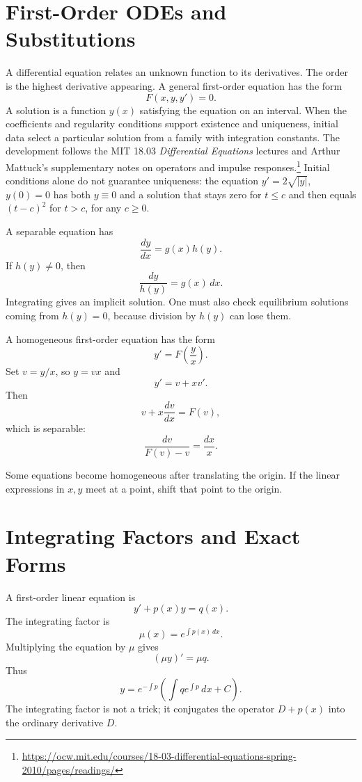 
\section{First-Order ODEs and Substitutions}

A differential equation relates an unknown function to its derivatives.  The order is the highest derivative appearing.  A general first-order equation has the form
\[
  F(x,y,y')=0.
\]
A solution is a function $y(x)$ satisfying the equation on an interval. When the coefficients and regularity conditions support existence and uniqueness, initial data select a particular solution from a family with integration constants. The development follows the MIT 18.03 \emph{Differential Equations} lectures and Arthur Mattuck's supplementary notes on operators and impulse responses.\footnote{\url{https://ocw.mit.edu/courses/18-03-differential-equations-spring-2010/pages/readings/}} Initial conditions alone do not guarantee uniqueness: the equation \(y'=2\sqrt{|y|}\), \(y(0)=0\) has both \(y\equiv0\) and a solution that stays zero for \(t\le c\) and then equals \((t-c)^2\) for \(t>c\), for any \(c\ge0\).

A separable equation has
\[
  \frac{dy}{dx}=g(x)h(y).
\]
If $h(y)\ne0$, then
\[
  \frac{dy}{h(y)}=g(x)\,dx.
\]
Integrating gives an implicit solution.  One must also check equilibrium solutions coming from $h(y)=0$, because division by $h(y)$ can lose them.

A homogeneous first-order equation has the form
\[
  y'=F\left(\frac yx\right).
\]
Set $v=y/x$, so $y=vx$ and
\[
  y'=v+xv'.
\]
Then
\[
  v+x\frac{dv}{dx}=F(v),
\]
which is separable:
\[
  \frac{dv}{F(v)-v}=\frac{dx}{x}.
\]

Some equations become homogeneous after translating the origin.  If the linear expressions in $x,y$ meet at a point, shift that point to the origin.

\section{Integrating Factors and Exact Forms}

A first-order linear equation is
\[
  y'+p(x)y=q(x).
\]
The integrating factor is
\[
  \mu(x)=e^{\int p(x)\,dx}.
\]
Multiplying the equation by $\mu$ gives
\[
  (\mu y)'=\mu q.
\]
Thus
\[
  y=e^{-\int p}
  \left(\int q e^{\int p}\,dx+C\right).
\]
The integrating factor is not a trick; it conjugates the operator $D+p(x)$ into the ordinary derivative $D$.

